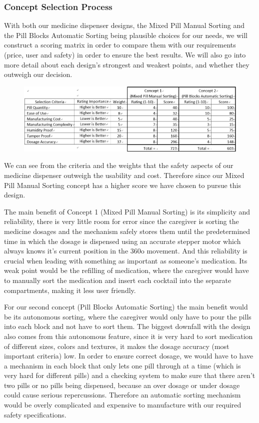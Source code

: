 \documentclass[12pt]{article}
\begin{document}
\subsubsection{Concept Selection Process}
With both our medicine dispenser designs, the Mixed Pill Manual Sorting and the Pill Blocks Automatic Sorting being plausible choices for our needs, we will construct a scoring matrix in order to compare them with our requirements (price, user and safety) in order to ensure the best results. We will also go into more detail about each design’s strongest and weakest points, and whether they outweigh our decision.
\begin{figure}[H]
	\centering
	\includegraphics[width=0.75\linewidth]{M3.jpg}
\end{figure}
We can see from the criteria and the weights that the safety aspects of our medicine dispenser outweigh the usability and cost. Therefore since our Mixed Pill Manual Sorting concept has a higher score we have chosen to pursue this design.
\par The main benefit of Concept 1 (Mixed Pill Manual Sorting) is its simplicity and reliability, there is very little room for error since the caregiver is sorting the medicine dosages and the mechanism safely stores them until the predetermined time in which the dosage is dispensed using an accurate stepper motor which always knows it’s current position in the 360o movement. And this reliability is crucial when leading with something as important as someone’s medication. Its weak point would be the refilling of medication, where the caregiver would have to manually sort the medication and insert each cocktail into the separate compartments, making it less user friendly.
\par For our second concept (Pill Blocks Automatic Sorting) the main benefit would be its autonomous sorting, where the caregiver would only have to pour the pills into each block and not have to sort them. The biggest downfall with the design also comes from this autonomous feature, since it is very hard to sort medication of different sizes, colors and textures, it makes the dosage accuracy (most important criteria) low. In order to ensure correct dosage, we would have to have a mechanism in each block that only lets one pill through at a time (which is very hard for different pills) and a checking system to make sure that there aren’t two pills or no pills being dispensed, because an over dosage or under dosage could cause serious repercussions. Therefore an automatic sorting mechanism would be overly complicated and expensive to manufacture with our required safety specifications.
\end{document}
